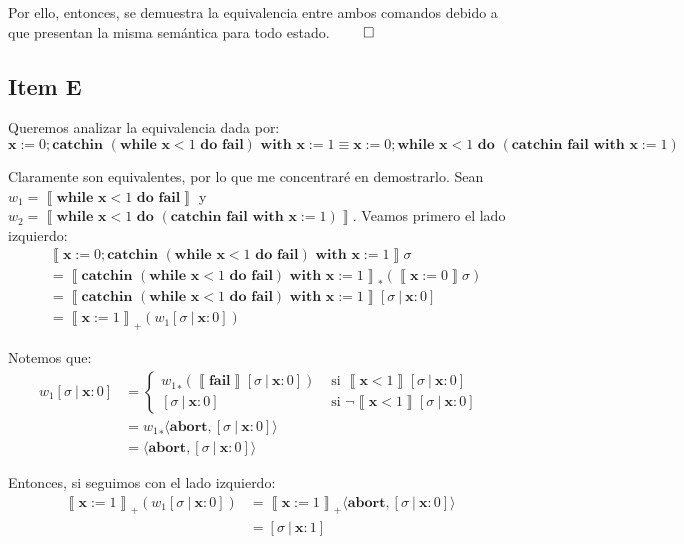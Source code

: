 \documentclass{article}
\newcommand{\sem}[1]{\left\llbracket #1\right\rrbracket}
\newcommand{\x}{\textbf{x}}
\newcommand{\cwhile}[2]{\textbf{while }#1\textbf{ do }#2}
\newcommand{\cfail}{\textbf{fail}}
\newcommand{\ccatch}[2]{\textbf{catchin }#1\textbf{ with }#2}
\newcommand{\cabort}[1]{\langle\textbf{abort}, #1\rangle}
\begin{document}
Por ello, entonces, se demuestra la equivalencia entre ambos comandos debido a que presentan la misma semántica para todo estado. $\qed$

\subsection*{Item E}
Queremos analizar la equivalencia dada por:
\begin{equation*}
  \x := 0; \ccatch{(\cwhile{\x < 1}{\cfail})}{\x := 1} \equiv \x := 0; \cwhile{\x < 1}{(\ccatch{\cfail}{\x := 1})}
\end{equation*}

Claramente son equivalentes, por lo que me concentraré en demostrarlo.
Sean $w_1 = \sem{\cwhile{\x<1}{\cfail}}$ y $w_2 = \sem{\cwhile{\x<1}{(\ccatch{\cfail}{\x := 1})}}$.
Veamos primero el lado izquierdo:
\begin{equation*}
  \begin{aligned}
    &\sem{\x := 0; \ccatch{(\cwhile{\x < 1}{\cfail})}{\x := 1}}\sigma \\ 
    &= \sem{\ccatch{(\cwhile{\x < 1}{\cfail})}{\x := 1}}_* (\sem{\x := 0}\sigma) \\ 
    &= \sem{\ccatch{(\cwhile{\x<1}{\cfail})}{\x := 1}} [\sigma\ |\ \x : 0] \\ 
    &= \sem{\x := 1}_+ (w_1 [\sigma\ |\ \x : 0])
  \end{aligned}
\end{equation*}

Notemos que:
\begin{equation*}
  \begin{aligned}
    w_1 [\sigma\ |\ \x : 0] &= \begin{cases}
                          {w_1}_* (\sem{\cfail}[\sigma\ |\ \x : 0]) &\text{ si }\sem{\x < 1}[\sigma\ |\ \x : 0] \\ 
                          [\sigma\ |\ \x : 0] &\text{ si }\neg\sem{\x < 1}[\sigma\ |\ \x : 0]
                        \end{cases} \\ 
                    &= {w_1}_* \cabort{[\sigma\ |\ \x : 0]} \\ 
                    &= \cabort{[\sigma\ |\ \x : 0]}
  \end{aligned}
\end{equation*}

Entonces, si seguimos con el lado izquierdo:
\begin{equation*}
  \begin{aligned}
    \sem{\x := 1}_+ (w_1 [\sigma\ |\ \x : 0]) &= \sem{\x := 1}_+ \cabort{[\sigma\ |\ \x : 0]} \\ 
                                      &= [\sigma\ |\ \x : 1]
  \end{aligned}
\end{equation*}
\end{document}
